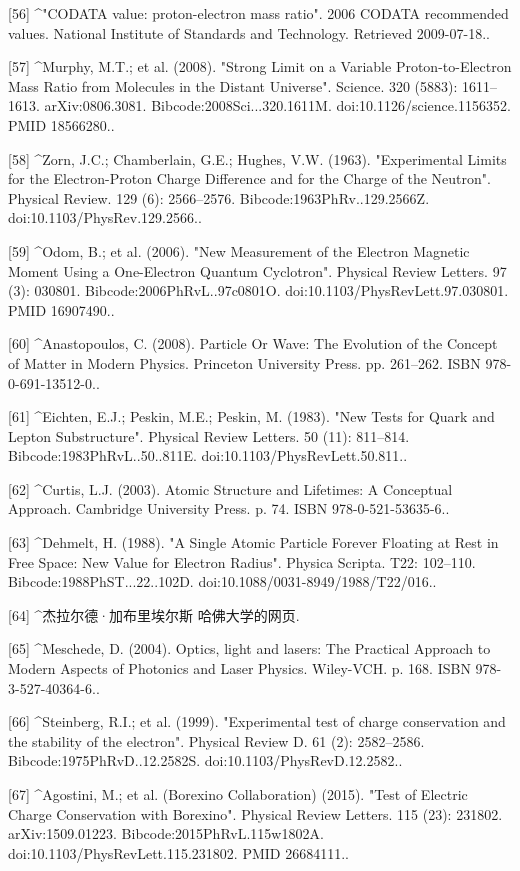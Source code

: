 [56]
^"CODATA value: proton-electron mass ratio". 2006 CODATA recommended values. National Institute of Standards and Technology. Retrieved 2009-07-18..

[57]
^Murphy, M.T.; et al. (2008). "Strong Limit on a Variable Proton-to-Electron Mass Ratio from Molecules in the Distant Universe". Science. 320 (5883): 1611–1613. arXiv:0806.3081. Bibcode:2008Sci...320.1611M. doi:10.1126/science.1156352. PMID 18566280..

[58]
^Zorn, J.C.; Chamberlain, G.E.; Hughes, V.W. (1963). "Experimental Limits for the Electron-Proton Charge Difference and for the Charge of the Neutron". Physical Review. 129 (6): 2566–2576. Bibcode:1963PhRv..129.2566Z. doi:10.1103/PhysRev.129.2566..

[59]
^Odom, B.; et al. (2006). "New Measurement of the Electron Magnetic Moment Using a One-Electron Quantum Cyclotron". Physical Review Letters. 97 (3): 030801. Bibcode:2006PhRvL..97c0801O. doi:10.1103/PhysRevLett.97.030801. PMID 16907490..

[60]
^Anastopoulos, C. (2008). Particle Or Wave: The Evolution of the Concept of Matter in Modern Physics. Princeton University Press. pp. 261–262. ISBN 978-0-691-13512-0..

[61]
^Eichten, E.J.; Peskin, M.E.; Peskin, M. (1983). "New Tests for Quark and Lepton Substructure". Physical Review Letters. 50 (11): 811–814. Bibcode:1983PhRvL..50..811E. doi:10.1103/PhysRevLett.50.811..

[62]
^Curtis, L.J. (2003). Atomic Structure and Lifetimes: A Conceptual Approach. Cambridge University Press. p. 74. ISBN 978-0-521-53635-6..

[63]
^Dehmelt, H. (1988). "A Single Atomic Particle Forever Floating at Rest in Free Space: New Value for Electron Radius". Physica Scripta. T22: 102–110. Bibcode:1988PhST...22..102D. doi:10.1088/0031-8949/1988/T22/016..

[64]
^杰拉尔德·加布里埃尔斯 哈佛大学的网页.

[65]
^Meschede, D. (2004). Optics, light and lasers: The Practical Approach to Modern Aspects of Photonics and Laser Physics. Wiley-VCH. p. 168. ISBN 978-3-527-40364-6..

[66]
^Steinberg, R.I.; et al. (1999). "Experimental test of charge conservation and the stability of the electron". Physical Review D. 61 (2): 2582–2586. Bibcode:1975PhRvD..12.2582S. doi:10.1103/PhysRevD.12.2582..

[67]
^Agostini, M.; et al. (Borexino Collaboration) (2015). "Test of Electric Charge Conservation with Borexino". Physical Review Letters. 115 (23): 231802. arXiv:1509.01223. Bibcode:2015PhRvL.115w1802A. doi:10.1103/PhysRevLett.115.231802. PMID 26684111..

